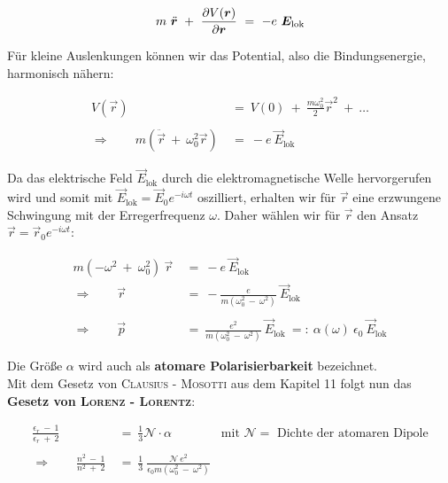 \begin{equation*}
m \ \ddot{\vec{r}} \ + \ \pdiff{V(\vec{r})}{\vec{r}} \ = \ -e \ \vec{E}_{\text{lok}}
\end{equation*}

Für kleine Auslenkungen können wir das Potential, also die Bindungsenergie, harmonisch nähern:

\begin{align*}
V(\vec{r})  \ &= \ V(0) \ + \ \frac{m\omega_0^2}{2}\vec{r}^2 \ + \ \ldots\\
\ \\
\Rightarrow \qquad m \left(\ddot{\vec{r}} \ + \ \omega_0^2\vec{r}\right)  \ &= \ - e \ \vec{E}_{\text{lok}}
\end{align*}

Da das elektrische Feld $\vec{E}_{\text{lok}}$ durch die elektromagnetische Welle hervorgerufen wird und somit mit $\vec{E}_{\text{lok}} = \vec{E}_0 e^{-i\omega t}$ oszilliert, erhalten wir für $\vec{r}$ eine erzwungene Schwingung mit der Erregerfrequenz $\omega$. Daher wählen wir für $\vec{r}$ den Ansatz $\vec{r}= \vec{r}_0 e^{-i\omega t}$:

\begin{align*}
m\left(-\omega^2 \ + \ \omega_0^2\right) \ \vec{r}  \ &= \ -e \ \vec{E}_{\text{lok}}\\
\Rightarrow \qquad \vec{r}  \ &= \ -\frac{e}{m\left(\omega^2_0 \ - \ \omega^2\right)} \ \vec{E}_{\text{lok}}\\
\ \\
\Rightarrow \qquad \vec{p}  \ &= \ \frac{e^2}{m\left(\omega_0^2 \ - \ \omega^2\right)} \ \vec{E}_{\text{lok}}  \ =: \ \alpha (\omega) \ \epsilon_0 \ \vec{E}_{\text{lok}}
\end{align*}

Die Größe $\alpha$ wird auch als \textbf{atomare Polarisierbarkeit} bezeichnet.\\
Mit dem Gesetz von \textsc{Clausius - Mosotti} aus dem Kapitel 11 folgt nun das \textbf{Gesetz von \textsc{Lorenz - Lorentz}}:

\begin{align*}
\frac{\epsilon_r \ - \ 1}{\epsilon_r \ + \ 2} \ &= \ \frac{1}{3} \mathcal{N} \cdot \alpha \qquad\qquad \text{mit }\mathcal{N}= \text{ Dichte der atomaren Dipole}\\
\ \\
\Rightarrow\qquad \frac{n^2 \ - \ 1}{n^2 \ + \ 2} \ &= \ \frac{1}{3} \ \frac{\mathcal{N} \ e^2}{\epsilon_0 m \left(\omega_0^2 \ - \ \omega^2\right)}
\end{align*}

